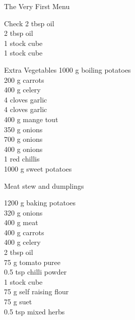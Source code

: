 \begin{menu}{The Very First Menu}
\begin{shoppinglist}{Check}
      2 tbsp oil \\ 
      2 tbsp oil \\ 
      1  stock cube \\ 
      1  stock cube \\ 
      \end{shoppinglist}%
      \begin{shoppinglist}{Extra Vegetables}
      1000 g boiling potatoes \\ 
      200 g carrots \\ 
      400 g celery \\ 
      4 cloves garlic \\ 
      4 cloves garlic \\ 
      400 g mange tout \\ 
      350 g onions \\ 
      700 g onions \\ 
      400 g onions \\ 
      1  red chillis \\ 
      1000 g sweet potatoes \\ 
      \end{shoppinglist}%
      \par\vfil %
    \vfil\clearpage
  
    \begin{recipe}{2}{Meat stew and dumplings}%
    
	
	
		\begin{ingredients}
		1200 g baking potatoes  \\
	320 g onions  \\
	400 g meat  \\
	400 g carrots  \\
	400 g celery  \\
	2 tbsp oil  \\
	75 g tomato puree  \\
	0.5 tsp chilli powder  \\
	1  stock cube  \\
	75 g self raising flour  \\
	75 g suet  \\
	0.5 tsp mixed herbs  \\
	
		\end{ingredients}
	

\end{recipe}
\end{menu}
